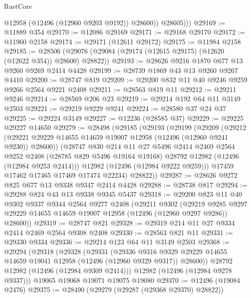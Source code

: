 \begin{lexlean}{RustCore}
\begin{coremodule}
              @12958
              (@12496 (@12960 @9203 @9192))
              @28600))
          @28605)))
@29169 := @11889 @354
@29170 := @12086 @29169
@29171 := @29168 @29170
@29172 := @11960 @2158
@29174 := @29171 (@12611 @29172)
@29175 := @11984 @2158
@29185 := @28506 (@29076 (@29084 (@29174 (@12615 @29175) (@12620 (@12622 @354)) @28600) @28822))
@29193 := @28626 @9216 @1870 @677 @13 @9260 @9269 @2414 @4428
@29199 := @28739 @1869 @43 @13 @9260 @9267 @4410
@29200 := @28747 @819
@29209 := @29200 @832 @11 @40 @9246 @9259 @9266 @2564 @9221 @2408
@29211 := @28563 @819 @11
@29212 := @29211 @9246
@29214 := @28569 @206 @23
@29219 := @29214 @192 @64 @11 @3149 @2503
@29221 := @29219 @9229 @9241
@29224 := @28580 @37 @24 @37
@29225 := @29224 @3149
@29227 := @12236 (@28585 @37)
@29229 := @29225 @29227 @14650
@29279 := @28498
    (@29185
      (@29193
        (@29199
          (@29209
            (@29212
              (@29221 @29229 @14655 @14659 @19007 @12958 (@12496 (@12960 @9241 @9230)) @28600))
            (@28747
              @830
              @214
              @11
              @27
              @5496
              @2414
              @2469
              @2564
              @9252
              @2408
              (@28785 @829 @5496 @19164 @19168)
              @28792
              @12982
              (@12496 (@12984 @9253 @2414)))
            @12982
            (@12496 (@12984 @9222 @9259)))
          @17459
          @17462
          @17465
          @17469
          @17474
          @22234)
        @28822))
@29287 := @28626 @9272 @825 @677 @13 @9338 @9347 @2414 @4428
@29288 := @28738 @817
@29294 := @29288 @824 @43 @13 @9338 @9345 @5437
@29318 := @29200
    @823
    @11
    @40
    @9302
    @9337
    @9344
    @2564
    @9277
    @2408
    (@29211
      @9302
      (@29219 @9285 @9297 @29229 @14655 @14659 @19007 @12958 (@12496 (@12960 @9297 @9286)) @28600))
@29319 := @28747 @821
@29328 := @29319 @214 @11 @27 @9334 @2414 @2469 @2564 @9308 @2408
@29330 := @28563 @821 @11
@29331 := @29330 @9334
@29336 := @29214 @123 @64 @11 @3149 @2503
@29368 := @29294
    (@29318
      (@29328
        (@29331
          (@29336
            @9316
            @9329
            @29229
            @14655
            @14659
            @19041
            @12958
            (@12496 (@12960 @9329 @9317))
            @28600))
        @28792
        @12982
        (@12496 (@12984 @9309 @2414)))
      @12982
      (@12496 (@12984 @9278 @9337)))
    @19065
    @19068
    @19071
    @19075
    @19080
@29370 := @12496 (@19084 @2476)
@29375 := @28490 (@29279 (@29287 (@29368 @29370) @28822))

\end{coremodule}
\end{lexlean}
